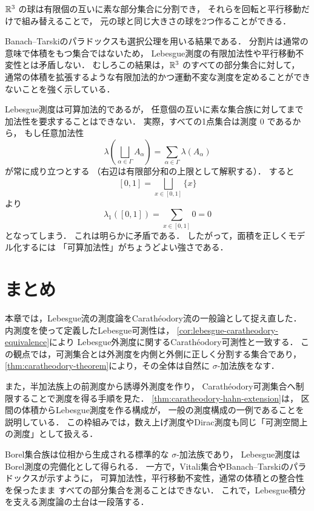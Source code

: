 \begin{theorem}\label{thm:banach-tarski}
$\mathbb R^3$ の球は有限個の互いに素な部分集合に分割でき，
それらを回転と平行移動だけで組み替えることで，
元の球と同じ大きさの球を2つ作ることができる．
\end{theorem}

\begin{remark}
Banach--Tarskiのパラドックスも選択公理を用いる結果である．
分割片は通常の意味で体積をもつ集合ではないため，
Lebesgue測度の有限加法性や平行移動不変性とは矛盾しない．
むしろこの結果は，$\mathbb R^3$ のすべての部分集合に対して，
通常の体積を拡張するような有限加法的かつ運動不変な測度を定めることができないことを強く示している．
\end{remark}

\begin{remark}[任意加法性は強すぎる]
Lebesgue測度は可算加法的であるが，
任意個の互いに素な集合族に対してまで加法性を要求することはできない．
実際，すべての1点集合は測度 $0$ であるから，
もし任意加法性
\[
\lambda\left(\bigsqcup_{\alpha \in \Gamma} A_\alpha\right)
=
\sum_{\alpha \in \Gamma} \lambda(A_\alpha)
\]
が常に成り立つとする
（右辺は有限部分和の上限として解釈する）．
すると
\[
[0,1] = \bigsqcup_{x \in [0,1]} \{x\}
\]
より
\[
\lambda_1([0,1]) = \sum_{x \in [0,1]} 0 = 0
\]
となってしまう．
これは明らかに矛盾である．
したがって，面積を正しくモデル化するには
「可算加法性」がちょうどよい強さである．
\end{remark}

\section{まとめ}

本章では，Lebesgue流の測度論をCarathéodory流の一般論として捉え直した．
内測度を使って定義したLebesgue可測性は，
\cref{cor:lebesgue-caratheodory-equivalence}により
Lebesgue外測度に関するCarathéodory可測性と一致する．
この観点では，可測集合とは外測度を内側と外側に正しく分割する集合であり，
\cref{thm:caratheodory-theorem}により，その全体は自然に $\sigma$-加法族をなす．

また，半加法族上の前測度から誘導外測度を作り，
Carathéodory可測集合へ制限することで測度を得る手順を見た．
\cref{thm:caratheodory-hahn-extension}は，
区間の体積からLebesgue測度を作る構成が，
一般の測度構成の一例であることを説明している．
この枠組みでは，数え上げ測度やDirac測度も同じ「可測空間上の測度」として扱える．

Borel集合族は位相から生成される標準的な $\sigma$-加法族であり，
Lebesgue測度はBorel測度の完備化として得られる．
一方で，Vitali集合やBanach--Tarskiのパラドックスが示すように，
可算加法性，平行移動不変性，通常の体積との整合性を保ったまま
すべての部分集合を測ることはできない．
これで，Lebesgue積分を支える測度論の土台は一段落する．
